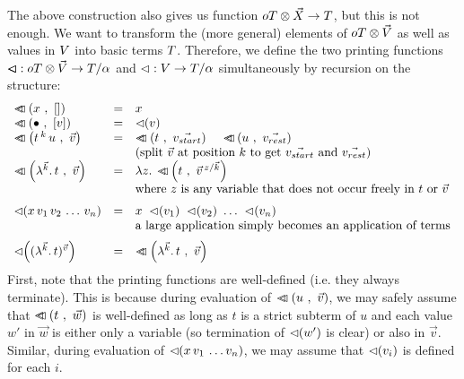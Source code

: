 \documentclass[submission,copyright,creativecommons]{eptcs}
\begin{document}
The above construction also gives us function $oT \otimes \vec {X} \rightarrow T$, but this is not enough. We want to transform the (more general) elements of $oT \otimes \vec {V}$ as well as values in $V$ into basic terms $T$.
Therefore, we
define the two printing functions $\lhd \hspace{-8pt} \lhd : oT \otimes \vec {V} \rightarrow T / \alpha$ and $\mathord{\lhd} : V \rightarrow T / \alpha$ simultaneously by recursion on the structure:
\[
\begin{array}{lcl}
\pr{x}{\emptyVec} & = & x \\
\pr{\ovar}{[v]} & = & \prVal v \\
\pr{t \oapp k u}{\vec v} & = & \ApA {\pr {t}{\vec{v_{start}}}  }  {\quad \pr {u}{\vec{v_{rest}}}} \\
&& \mbox{(split $\vec v$ at position $k$ to get $\vec{v_{start}}$ and $\vec{v_{rest}}$)} \\
\pr{\LaO {\vec k} t}{\vec v} & = & \LaA z {\pr {t} {  \multiinsert{\vec v}{\vec k}{z}   }}   \\
\medskip
&& \mbox{where $z$ is any variable that does not occur freely in $t$ or $\vec v$ } \\
\prVal{x \sspace v_1 \sspace v_2 \sspace \ldots \sspace v_n} & = & x \ \prVal{v_1} \ \prVal{v_2} \ \ldots \ \prVal{v_n} \\
\medskip && \mbox{a large application simply becomes an application of terms} \\
\prVal{\Val {\vec k} t {\vec v}} & = & \pr{\LaO {\vec k} t}{\vec v} \\
\end{array}
\]
First, note that the printing functions are well-defined (i.e. they always terminate). This is because during evaluation of $\lhd \hspace{-8pt} \lhd \left( u \ , \ \vec v \right)$, we may safely assume that $\lhd \hspace{-8pt} \lhd \left( t \ , \ \vec w \right)$ is well-defined as long as $t$ is a strict subterm of $u$ and each value $w'$ in $\vec w$ is either only a variable (so termination of $\lhd \hspace{-2pt} \left( w' \right)$ is clear) or also in $\vec v$. Similar, during evaluation of $\lhd \hspace{-2pt} \left( x \, v_1 \, \ldots v_n \right)$, we may assume that $\lhd \hspace{-2pt} \left( v_i \right)$ is defined for each $i$.
\end{document}
